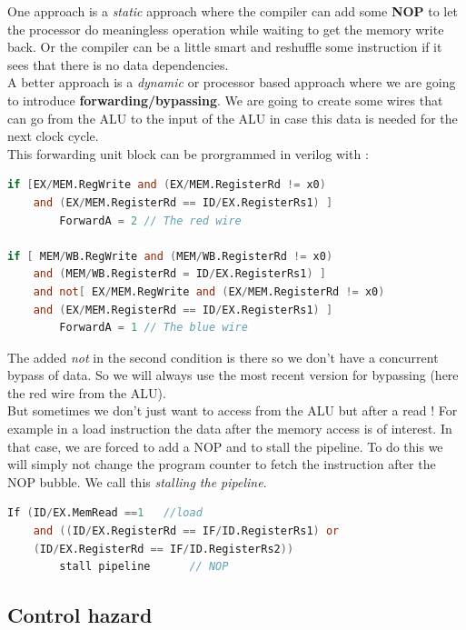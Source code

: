 \documentclass{report}
\begin{document}
One approach is a \textit{static} approach where the compiler can add some \textbf{NOP} to let the processor do meaningless operation while waiting to get the memory write back. Or the compiler can be a little smart and reshuffle some instruction if it sees that there is no data dependencies.\\

A better approach is a \textit{dynamic} or processor based approach where we are going to introduce \textbf{forwarding/bypassing}. We are going to create some wires that can go from the ALU to the input of the ALU in case this data is needed for the next clock cycle.\\

This forwarding unit block can be prorgrammed in verilog with :

\begin{lstlisting}[language=verilog, caption=data hazard]
if [EX/MEM.RegWrite and (EX/MEM.RegisterRd != x0) 
    and (EX/MEM.RegisterRd == ID/EX.RegisterRs1) ]
        ForwardA = 2 // The red wire

if [ MEM/WB.RegWrite and (MEM/WB.RegisterRd != x0)
    and (MEM/WB.RegisterRd = ID/EX.RegisterRs1) ]
    and not[ EX/MEM.RegWrite and (EX/MEM.RegisterRd != x0)
    and (EX/MEM.RegisterRd == ID/EX.RegisterRs1) ]
        ForwardA = 1 // The blue wire
\end{lstlisting}

The added \textit{not} in the second condition is there so we don't have a concurrent bypass of data. So we will always use the most recent version for bypassing (here the red wire from the ALU).\\

But sometimes we don't just want to access from the ALU but after a read ! For example in a load instruction the data after the memory access is of interest. In that case, we are forced to add a NOP and to stall the pipeline. To do this we will simply not change the program counter to fetch the instruction after the NOP bubble. We call this \textit{stalling the pipeline}.

\begin{lstlisting}[language=verilog, caption=load data hazard]
If (ID/EX.MemRead ==1   //load
    and ((ID/EX.RegisterRd == IF/ID.RegisterRs1) or
    (ID/EX.RegisterRd == IF/ID.RegisterRs2))
        stall pipeline      // NOP
\end{lstlisting}

\subsection{Control hazard}
\end{document}
